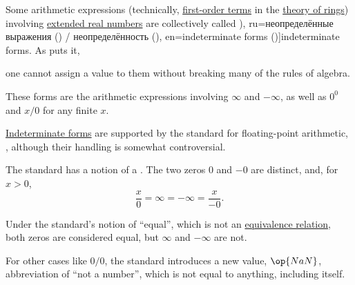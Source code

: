 \begin{definition}\label{def:indeterminate_form}\mimprovised
  Some arithmetic expressions (technically, \hyperref[def:fol_term]{first-order terms} in the \hyperref[def:ring/theory]{theory of rings}) involving \hyperref[def:extended_real_numbers]{extended real numbers} are collectively called \term[bg=неопределености (\cite[228]{ИлинСадовничиСендов1984АнализТом1}), ru=неопределённые выражения (\cite[\S 41]{Фихтенгольц1968ОсновыАнализаТом1}) / неопределённость (\cite[235]{ИльинСадовничийСендов1985АнализТом1}), en=indeterminate forms (\cite[12]{Tao2011MeasureTheory})]{indeterminate forms}. As  puts it,
  \begin{displayquote}
    \textellipsis one cannot assign a value to them without breaking many of the rules of algebra.
  \end{displayquote}

  These forms are the arithmetic expressions involving \( \infty \) and \( -\infty \), as well as \( 0^0 \) and \( x / 0 \) for any finite \( x \).
\end{definition}

\begin{remark}\label{rem:floating_point_indeterminate_forms}
  \hyperref[def:indeterminate_form]{Indeterminate forms} are supported by the standard for floating-point arithmetic, \cite[31]{IEEE:754:2019}, although their handling is somewhat controversial.

  The standard has a notion of a . The two zeros \( 0 \) and \( -0 \) are distinct, and, for \( x > 0 \),
  \begin{equation*}
    \frac x 0 = \infty = -\infty = \frac x {-0}.
  \end{equation*}

  Under the standard's notion of \enquote{equal}, which is not an \hyperref[def:equivalence_relation]{equivalence relation}, both zeros are considered equal, but \( \infty \) and \( -\infty \) are not.

  For other cases like \( 0 / 0 \), the standard introduces a new value, \( \op{NaN} \), abbreviation of \enquote{not a number}, which is not equal to anything, including itself.
\end{remark}

